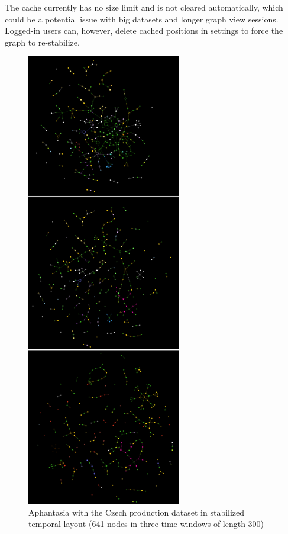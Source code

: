 The cache currently has no size limit and is not cleared automatically, which could be a potential issue with big datasets and longer graph view sessions.
Logged-in users can, however, delete cached positions in settings to force the graph to re-stabilize.

\begin{figure}[p]
    \includegraphics[height=200mm, keepaspectratio]{img/afantazie_production_dataset_in_time_window.png}
    \caption{Aphantasia with the Czech production dataset in stabilized temporal layout (641 nodes in three time windows of length 300)}
    \label{obr:afantazie_production_dataset_in_time_window}
\end{figure}

